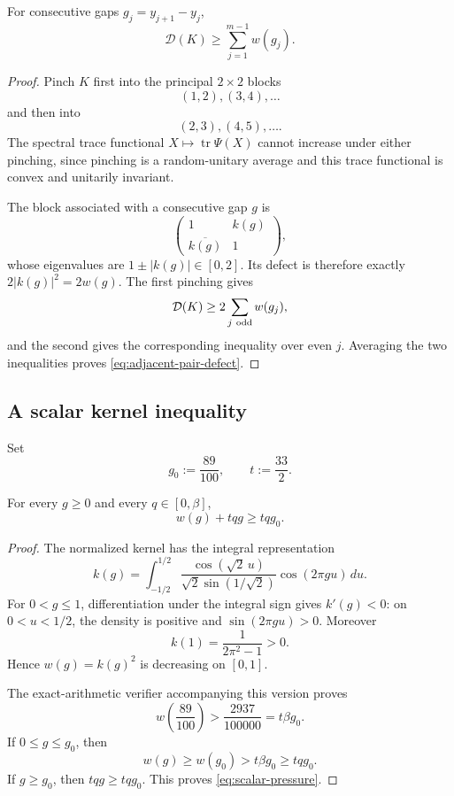 \begin{lemma}\label{lem:adjacent-pairs}
For consecutive gaps \(g_j=y_{j+1}-y_j\),
\begin{equation}\label{eq:adjacent-pair-defect}
 \boxed{\mathcal D(K)\ge\sum_{j=1}^{m-1}w(g_j)}.
\end{equation}
\end{lemma}

\begin{proof}
Pinch \(K\) first into the principal \(2\times2\) blocks
\[
 (1,2),(3,4),\ldots
\]
and then into
\[
 (2,3),(4,5),\ldots .
\]
The spectral trace functional \(X\mapsto\operatorname{tr}\Psi(X)\) cannot
increase under either pinching, since pinching is a random-unitary average
and this trace functional is convex and unitarily invariant.

The block associated with a consecutive gap \(g\) is
\[
 \begin{pmatrix}1&k(g)\\ \overline{k(g)}&1\end{pmatrix},
\]
whose eigenvalues are \(1\pm|k(g)|\in[0,2]\).  Its defect is therefore
exactly \(2|k(g)|^2=2w(g)\).  The first pinching gives
\[
 \mathcal D(K)\ge2\sum_{j\ {\rm odd}}w(g_j),
\]
and the second gives the corresponding inequality over even \(j\).  Averaging
the two inequalities proves \eqref{eq:adjacent-pair-defect}.
\end{proof}


\subsection{A scalar kernel inequality}

Set
\begin{equation}\label{eq:g0t}
 g_0:=\frac{89}{100},
 \qquad
 t:=\frac{33}{2}.
\end{equation}

\begin{lemma}\label{lem:scalar-pressure}
For every \(g\ge0\) and every \(q\in[0,\beta]\),
\begin{equation}\label{eq:scalar-pressure}
 w(g)+tqg\ge tqg_0.
\end{equation}
\end{lemma}

\begin{proof}
The normalized kernel has the integral representation
\[
 k(g)
 =
 \int_{-1/2}^{1/2}
 \frac{\cos(\sqrt2\,u)}
      {\sqrt2\sin(1/\sqrt2)}
 \cos(2\pi gu)\,du .
\]
For \(0<g\le1\), differentiation under the integral sign gives
\(k'(g)<0\): on \(0<u<1/2\), the density is positive and
\(\sin(2\pi gu)>0\).  Moreover
\[
 k(1)=\frac1{2\pi^2-1}>0.
\]
Hence \(w(g)=k(g)^2\) is decreasing on \([0,1]\).

The exact-arithmetic verifier accompanying this version proves
\begin{equation}\label{eq:w089}
 w\!\left(\frac{89}{100}\right)
 >
 \frac{2937}{100000}
 =
 t\beta g_0.
\end{equation}
If \(0\le g\le g_0\), then
\[
 w(g)\ge w(g_0)>t\beta g_0\ge tqg_0.
\]
If \(g\ge g_0\), then \(tqg\ge tqg_0\).  This proves
\eqref{eq:scalar-pressure}.
\end{proof}



